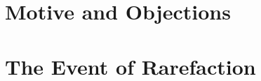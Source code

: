 \documentclass[12pt]{article}
\begin{document}

\section{Motive and Objections} %
\label{sec:motive_and_objections}




\section{The Event of Rarefaction} %
\label{sec:the_event_of_rarefaction}




 
 
\end{document}
